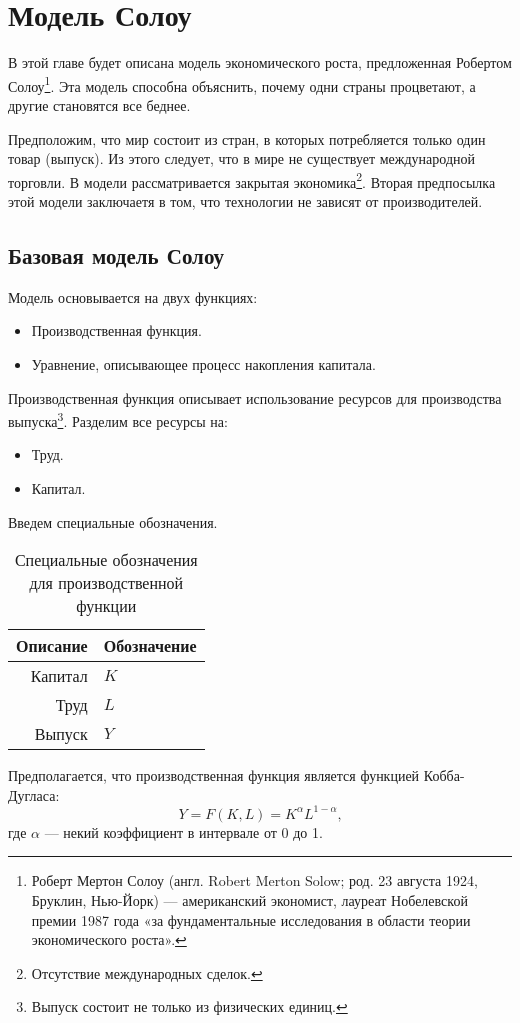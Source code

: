 \chapter{Модель Солоу}
\label{cha:solow_models}

В этой главе будет описана модель экономического роста, предложенная Робертом Солоу\footnote{Роберт Мертон Солоу (англ. Robert Merton Solow; род. 23 августа 1924, Бруклин, Нью-Йорк) --- американский экономист, лауреат Нобелевской премии 1987 года «за фундаментальные исследования в области теории экономического роста»\cite{wiki_solow}.}.
Эта модель способна объяснить, почему одни страны процветают, а другие становятся все беднее.

Предположим, что мир состоит из стран, в которых потребляется только один товар (выпуск).
Из этого следует, что в мире не существует международной торговли.
В модели рассматривается закрытая экономика\footnote{Отсутствие международных сделок.}.
Вторая предпосылка этой модели заключаетя в том, что технологии не зависят от производителей.

\section{Базовая модель Солоу}

Модель основывается на двух функциях:
\begin{itemize}
	\item Производственная функция.
	\item Уравнение, описывающее процесс накопления капитала.
\end{itemize}
Производственная функция описывает использование ресурсов для производства выпуска\footnote{Выпуск состоит не только из физических единиц.}.
Разделим все ресурсы на:
\begin{itemize}
	\item Труд.
	\item Капитал.
\end{itemize}
Введем специальные обозначения.
\begin{table}[ht]
	\centering
	\caption{Специальные обозначения для производственной функции}
	\begin{tabular}{|r|l|}
		\hline
		Описание & Обозначение \\ \hline
		Капитал  &      $K$    \\
		Труд     &      $L$    \\
		Выпуск   &      $Y$    \\ \hline
		\end{tabular}%
	\label{tab:prod_func}
\end{table}
Предполагается, что производственная функция является функцией Кобба-Дугласа:
\begin{equation}
	Y = F(K, L) = K^{\alpha}L^{1-\alpha}\text{,}
\label{F:Cob_Duglas}
\end{equation}
где $\alpha$ --- некий коэффициент в интервале от 0 до 1.

